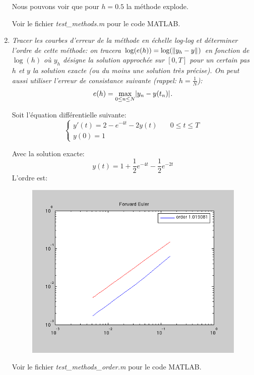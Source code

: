 \documentclass[a4paper,10pt]{article}
\begin{document}
\begin{enumerate}
    Nous pouvons voir que pour $h = 0.5$ la méthode explode.

    Voir le fichier \emph{test\_methods.m} pour le code MATLAB.

    \item \emph{Tracer les courbes d’erreur de la méthode en échelle log-log et
    déterminer l'ordre de cette méthode: on tracera $\log(e(h)) = \log(\lVert y_h -
    y\rVert_{})$ en fonction de $\log(h)$ où $y_h$ désigne la solution approchée sur
    $[0, T]$ pour un certain pas $h$ et $y$ la solution exacte (ou du moins une
    solution très précise). On peut aussi utiliser l'erreur de consistance
    suivante (rappel: $h = \frac{1}{N}$):}
\[
    e(h) = \max_{0 \leq n \leq N} \lvert y_n - y(t_n)\rvert_{}.
\]

    Soit l'équation différentielle suivante:
\begin{equation}\label{eq:eq2}
\left\{
\begin{array}{ll}
    y'(t) = 2 - e^{-4t} - 2y(t) & \quad 0 \leq t \leq T \\
    y(0) = 1
\end{array}
\right.
\end{equation}

    Avec la solution exacte:
\[
    y(t) = 1 + \frac{1}{2} e^{-4t} - \frac{1}{2} e^{-2t}
\]
\clearpage
    L'ordre est:
\begin{figure}[h!]
    \centering
    \includegraphics[scale=0.5]{./img/order-forward-euler.png}
\end{figure}

    Voir le fichier \emph{test\_methods\_order.m} pour le code MATLAB.
\end{enumerate}
\end{document}
